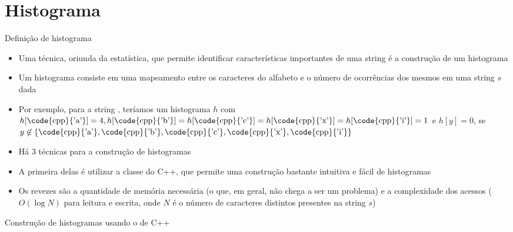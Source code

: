 \section{Histograma}

\begin{frame}[fragile]{Definição de histograma}

    \begin{itemize}
        \item Uma técnica, oriunda da estatística, que permite identificar características 
        importantes de uma string é a construção de um histograma
        \pause

        \item Um histograma consiste em uma mapeamento entre os caracteres do alfabeto e o número 
            de ocorrências dos mesmos em uma string $s$ dada
        \pause

        \item Por exemplo, para a string , teríamos um histograma $h$ com
        $h[\mbox{\code{cpp}{'a'}}] = 4, h[\mbox{\code{cpp}{'b'}}] = h[\mbox{\code{cpp}{'c'}}] = h[\mbox{\code{cpp}{'x'}}] = h[\mbox{\code{cpp}{'i'}}] = 1$ e $h[y] = 0$, se $y \not \in \lbrace \mbox{\code{cpp}{'a'}}, \mbox{\code{cpp}{'b'}}, \mbox{\code{cpp}{'c'}}, \mbox{\code{cpp}{'x'}}, \mbox{\code{cpp}{'i'}}\rbrace$
        \pause

        \item Há 3 técnicas para a construção de histogramas
        \pause

        \item A primeira delas é utilizar a classe  do C++, que permite uma 
            construção bastante intuitiva e fácil de histogramas
        \pause

        \item Os revezes são a quantidade de memória necessária (o que, em geral, não chega a ser 
            um problema) e a complexidade dos acessos ($O(\log N)$ para leitura e escrita, onde
            $N$ é o número de caracteres distintos presentes na string $s$)
    \end{itemize}

\end{frame}

\begin{frame}[fragile]{Construção de histogramas usando o  de C++} 
\end{frame}


